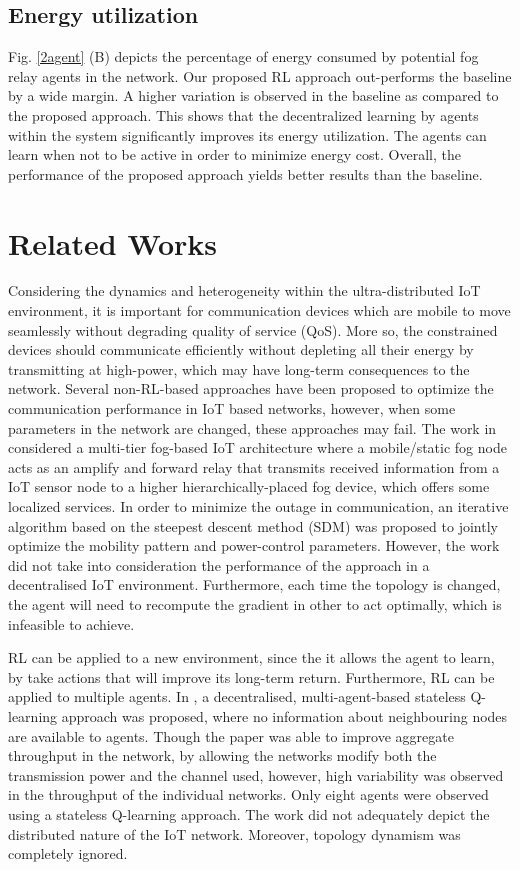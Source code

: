 \documentclass[journal]{IEEEtran}
\begin{document}
\subsection{Energy utilization}
Fig. \ref{2agent} (B) depicts the percentage of energy consumed by potential fog relay agents in the network. Our proposed RL approach out-performs the baseline by a wide margin. A higher variation is observed in the baseline as compared to the proposed approach. This shows that the decentralized learning by agents within the system significantly improves its energy utilization. The agents can learn when not to be active in order to minimize energy cost.
Overall, the performance of the proposed approach yields better results than the baseline.

\section{Related Works}
Considering the dynamics and heterogeneity within the ultra-distributed IoT environment, it is important for communication devices which are mobile to move seamlessly without degrading quality of service (QoS). More so, the constrained devices should communicate efficiently without depleting all their energy by transmitting at high-power, which may have long-term consequences to the network. Several non-RL-based approaches have been proposed to optimize the communication performance in IoT based networks, however, when some parameters in the network are changed, these approaches may fail.
The work in~\cite{OmoniwaRelay2018} considered a multi-tier fog-based IoT architecture where a mobile/static fog node acts as an amplify and forward relay that transmits received information from a IoT sensor node to a higher hierarchically-placed fog device, which offers some localized services. In order to minimize the outage in communication, an iterative algorithm based on the steepest descent method (SDM) was proposed to jointly optimize the mobility pattern and power-control parameters. However, the work did not take into consideration the performance of the approach in a decentralised IoT environment. Furthermore, each time the topology is changed, the agent will need to recompute the gradient in other to act optimally, which is infeasible to achieve.

RL can be applied to a new environment, since the it allows the agent to learn, by take actions that will improve its long-term return. Furthermore, RL can be applied to multiple agents. In \cite{Wilhelmi2017}, a decentralised, multi-agent-based stateless Q-learning approach was proposed, where no information about neighbouring nodes are available to agents. Though the paper was able to improve aggregate throughput in the network, by allowing the networks modify both the transmission power and the channel used, however, high variability was observed in the throughput of the individual networks. Only eight agents were observed using a stateless Q-learning approach. The work did not adequately depict the distributed nature of the IoT network. Moreover, topology dynamism was completely ignored.
\end{document}
